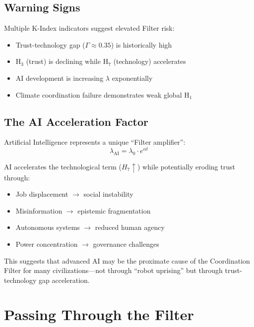 \documentclass[11pt,a4paper]{article}
\begin{document}
\subsection{Warning Signs}

Multiple K-Index indicators suggest elevated Filter risk:
\begin{itemize}
    \item Trust-technology gap ($\Gamma \approx 0.35$) is historically high
    \item H$_3$ (trust) is declining while H$_7$ (technology) accelerates
    \item AI development is increasing $\lambda$ exponentially
    \item Climate coordination failure demonstrates weak global H$_1$
\end{itemize}

\subsection{The AI Acceleration Factor}

Artificial Intelligence represents a unique ``Filter amplifier'':
\begin{equation}
\lambda_{\text{AI}} = \lambda_0 \cdot e^{\alpha t}
\end{equation}

AI accelerates the technological term ($H_7 \uparrow$) while potentially eroding trust through:
\begin{itemize}
    \item Job displacement $\to$ social instability
    \item Misinformation $\to$ epistemic fragmentation
    \item Autonomous systems $\to$ reduced human agency
    \item Power concentration $\to$ governance challenges
\end{itemize}

This suggests that advanced AI may be the proximate cause of the Coordination Filter for many civilizations---not through ``robot uprising'' but through trust-technology gap acceleration.

\section{Passing Through the Filter}
\end{document}
